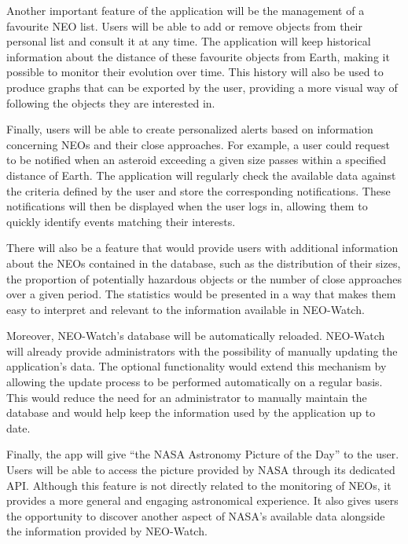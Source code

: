 \vspace{0.25cm}


Another important feature of the application will be the management of a favourite NEO list. Users will be able to add or remove objects from their personal list and consult it at any time. The application will keep historical information about the distance of these favourite objects from Earth, making it possible to monitor their evolution over time. This history will also be used to produce graphs that can be exported by the user, providing a more visual way of following the objects they are interested in.


\vspace{0.25cm}

Finally, users will be able to create personalized alerts based on information concerning NEOs and their close approaches. For example, a user could request to be notified when an asteroid exceeding a given size passes within a specified distance of Earth. The application will regularly check the available data against the criteria defined by the user and store the corresponding notifications. These notifications will then be displayed when the user logs in, allowing them to quickly identify events matching their interests.


\vspace{0.25cm}

There will also be a feature that would provide users with additional information about the NEOs contained in the database, such as the distribution of their sizes, the proportion of potentially hazardous objects or the number of close approaches over a given period. The statistics would be presented in a way that makes them easy to interpret and relevant to the information available in NEO-Watch.

\vspace{0.25cm}

Moreover, NEO-Watch’s database will be automatically reloaded. NEO-Watch will already provide administrators with the possibility of manually updating the application's data. The optional functionality would extend this mechanism by allowing the update process to be performed automatically on a regular basis. This would reduce the need for an administrator to manually maintain the database and would help keep the information used by the application up to date.


\vspace{0.25cm}


Finally, the app will give “the NASA Astronomy Picture of the Day” to the user. Users will be able to access the picture provided by NASA through its dedicated API. Although this feature is not directly related to the monitoring of NEOs, it provides a more general and engaging astronomical experience. It also gives users the opportunity to discover another aspect of NASA's available data alongside the information provided by NEO-Watch.

